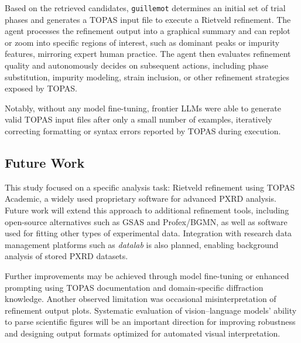 Based on the retrieved candidates, \texttt{guillemot} determines an initial set of trial phases and generates a TOPAS \cite{Coelho2018} input file to execute a Rietveld refinement. The agent processes the refinement output into a graphical summary and can replot or zoom into specific regions of interest, such as dominant peaks or impurity features, mirroring expert human practice. The agent then evaluates refinement quality and autonomously decides on subsequent actions, including phase substitution, impurity modeling, strain inclusion, or other refinement strategies exposed by TOPAS.

Notably, without any model fine-tuning, frontier LLMs were able to generate valid TOPAS input files after only a small number of examples, iteratively correcting formatting or syntax errors reported by TOPAS during execution.

\subsection*{Future Work}
This study focused on a specific analysis task: Rietveld refinement using TOPAS Academic, a widely used proprietary software for advanced PXRD analysis. Future work will extend this approach to additional refinement tools, including open-source alternatives such as GSAS and Profex/BGMN, as well as software used for fitting other types of experimental data. Integration with research data management platforms such as \emph{datalab} is also planned, enabling background analysis of stored PXRD datasets.

Further improvements may be achieved through model fine-tuning or enhanced prompting using TOPAS documentation and domain-specific diffraction knowledge. Another observed limitation was occasional misinterpretation of refinement output plots. Systematic evaluation of vision–language models’ ability to parse scientific figures will be an important direction for improving robustness and designing output formats optimized for automated visual interpretation.


